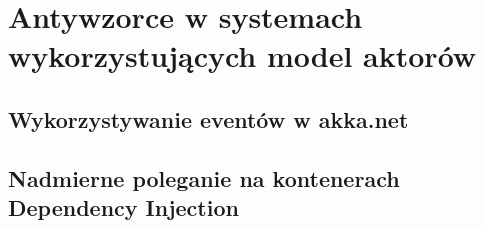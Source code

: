 \chapter{Antywzorce w systemach wykorzystujących model aktorów}
\section{Wykorzystywanie eventów w akka.net}
\section{Nadmierne poleganie na kontenerach Dependency Injection}
